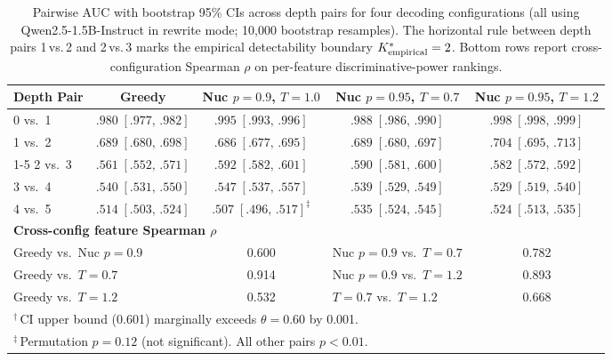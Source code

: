 \FloatBarrier
\begin{table}[t]
  \centering
  \caption{Pairwise AUC with bootstrap 95\% CIs across depth pairs for four decoding configurations (all using Qwen2.5-1.5B-Instruct in rewrite mode; 10{,}000 bootstrap resamples). The horizontal rule between depth pairs 1\,vs.\,2 and 2\,vs.\,3 marks the empirical detectability boundary ${K^*_{\text{empirical}}}=2$. Bottom rows report cross-configuration Spearman $\rho$ on per-feature discriminative-power rankings.}
  \label{tab:s2_decoding}
  \footnotesize
  \begin{tabular}{lcccc}
    \toprule
    \textbf{Depth Pair} & \textbf{Greedy} & \textbf{Nuc $p{=}0.9$, $T{=}1.0$} & \textbf{Nuc $p{=}0.95$, $T{=}0.7$} & \textbf{Nuc $p{=}0.95$, $T{=}1.2$} \\
    \midrule
    0 vs.\ 1 & $.980\;[.977,\,.982]$ & $.995\;[.993,\,.996]$ & $.988\;[.986,\,.990]$ & $.998\;[.998,\,.999]$ \\
    1 vs.\ 2 & $.689\;[.680,\,.698]$ & $.686\;[.677,\,.695]$ & $.689\;[.680,\,.697]$ & $.704\;[.695,\,.713]$ \\
    \cmidrule(lr){1-5}
    2 vs.\ 3 & $.561\;[.552,\,.571]$ & $.592\;[.582,\,.601]$\rlap{$^\dagger$} & $.590\;[.581,\,.600]$ & $.582\;[.572,\,.592]$ \\
    3 vs.\ 4 & $.540\;[.531,\,.550]$ & $.547\;[.537,\,.557]$ & $.539\;[.529,\,.549]$ & $.529\;[.519,\,.540]$ \\
    4 vs.\ 5 & $.514\;[.503,\,.524]$ & $.507\;[.496,\,.517]^{\ddagger}$ & $.535\;[.524,\,.545]$ & $.524\;[.513,\,.535]$ \\
    \midrule
    \multicolumn{5}{l}{\textbf{Cross-config feature Spearman $\rho$}} \\
    \midrule
    \multicolumn{2}{l}{Greedy vs.\ Nuc $p{=}0.9$} & 0.600 &
    \multicolumn{1}{l}{Nuc $p{=}0.9$ vs.\ $T{=}0.7$} & 0.782 \\
    \multicolumn{2}{l}{Greedy vs.\ $T{=}0.7$} & 0.914 &
    \multicolumn{1}{l}{Nuc $p{=}0.9$ vs.\ $T{=}1.2$} & 0.893 \\
    \multicolumn{2}{l}{Greedy vs.\ $T{=}1.2$} & 0.532 &
    \multicolumn{1}{l}{$T{=}0.7$ vs.\ $T{=}1.2$} & 0.668 \\
    \bottomrule
    \multicolumn{5}{l}{${}^{\dagger}$\,CI upper bound (0.601) marginally exceeds $\theta{=}0.60$ by 0.001.} \\
    \multicolumn{5}{l}{${}^{\ddagger}$\,Permutation $p = 0.12$ (not significant). All other pairs $p < 0.01$.}
  \end{tabular}
\end{table}

